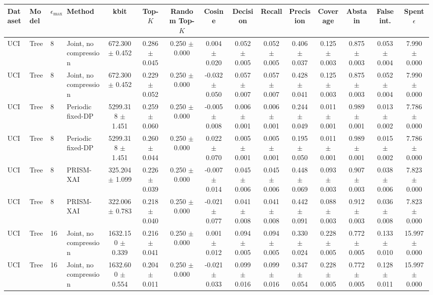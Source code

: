 \begin{tabular}{llllccccccccccc}
\toprule
Dataset & Model & $\epsilon_{\max}$ & Method & kbit & Top-$K$ & Random Top-$K$ & Cosine & Decision & Recall & Precision & Coverage & Abstain & False int. & Spent $\epsilon$ \\
\midrule
UCI & Tree & 8 & Joint, no compression & 672.300 $\pm$ 0.452 & 0.286 $\pm$ 0.045 & 0.250 $\pm$ 0.000 & 0.004 $\pm$ 0.020 & 0.052 $\pm$ 0.005 & 0.052 $\pm$ 0.005 & 0.406 $\pm$ 0.037 & 0.125 $\pm$ 0.003 & 0.875 $\pm$ 0.003 & 0.053 $\pm$ 0.004 & 7.990 $\pm$ 0.000 \\
UCI & Tree & 8 & Joint, no compression & 672.300 $\pm$ 0.452 & 0.229 $\pm$ 0.052 & 0.250 $\pm$ 0.000 & -0.032 $\pm$ 0.050 & 0.057 $\pm$ 0.007 & 0.057 $\pm$ 0.007 & 0.428 $\pm$ 0.041 & 0.125 $\pm$ 0.003 & 0.875 $\pm$ 0.003 & 0.052 $\pm$ 0.004 & 7.990 $\pm$ 0.000 \\
UCI & Tree & 8 & Periodic fixed-DP & 5299.318 $\pm$ 1.451 & 0.259 $\pm$ 0.060 & 0.250 $\pm$ 0.000 & -0.005 $\pm$ 0.008 & 0.006 $\pm$ 0.001 & 0.006 $\pm$ 0.001 & 0.244 $\pm$ 0.049 & 0.011 $\pm$ 0.001 & 0.989 $\pm$ 0.001 & 0.013 $\pm$ 0.002 & 7.786 $\pm$ 0.000 \\
UCI & Tree & 8 & Periodic fixed-DP & 5299.318 $\pm$ 1.451 & 0.260 $\pm$ 0.044 & 0.250 $\pm$ 0.000 & 0.022 $\pm$ 0.070 & 0.005 $\pm$ 0.001 & 0.005 $\pm$ 0.001 & 0.195 $\pm$ 0.050 & 0.011 $\pm$ 0.001 & 0.989 $\pm$ 0.001 & 0.015 $\pm$ 0.002 & 7.786 $\pm$ 0.000 \\
UCI & Tree & 8 & PRISM-XAI & 325.204 $\pm$ 1.099 & 0.226 $\pm$ 0.039 & 0.250 $\pm$ 0.000 & -0.007 $\pm$ 0.014 & 0.045 $\pm$ 0.006 & 0.045 $\pm$ 0.006 & 0.448 $\pm$ 0.069 & 0.093 $\pm$ 0.003 & 0.907 $\pm$ 0.003 & 0.038 $\pm$ 0.006 & 7.823 $\pm$ 0.000 \\
UCI & Tree & 8 & PRISM-XAI & 322.006 $\pm$ 0.783 & 0.218 $\pm$ 0.040 & 0.250 $\pm$ 0.000 & -0.021 $\pm$ 0.077 & 0.041 $\pm$ 0.008 & 0.041 $\pm$ 0.008 & 0.442 $\pm$ 0.091 & 0.088 $\pm$ 0.003 & 0.912 $\pm$ 0.003 & 0.036 $\pm$ 0.008 & 7.823 $\pm$ 0.000 \\
UCI & Tree & 16 & Joint, no compression & 1632.150 $\pm$ 0.339 & 0.216 $\pm$ 0.041 & 0.250 $\pm$ 0.000 & 0.001 $\pm$ 0.012 & 0.094 $\pm$ 0.005 & 0.094 $\pm$ 0.005 & 0.330 $\pm$ 0.024 & 0.228 $\pm$ 0.005 & 0.772 $\pm$ 0.005 & 0.133 $\pm$ 0.010 & 15.997 $\pm$ 0.000 \\
UCI & Tree & 16 & Joint, no compression & 1632.600 $\pm$ 0.554 & 0.204 $\pm$ 0.011 & 0.250 $\pm$ 0.000 & -0.021 $\pm$ 0.033 & 0.099 $\pm$ 0.016 & 0.099 $\pm$ 0.016 & 0.347 $\pm$ 0.054 & 0.228 $\pm$ 0.005 & 0.772 $\pm$ 0.005 & 0.128 $\pm$ 0.011 & 15.997 $\pm$ 0.000 \\

\end{tabular}
